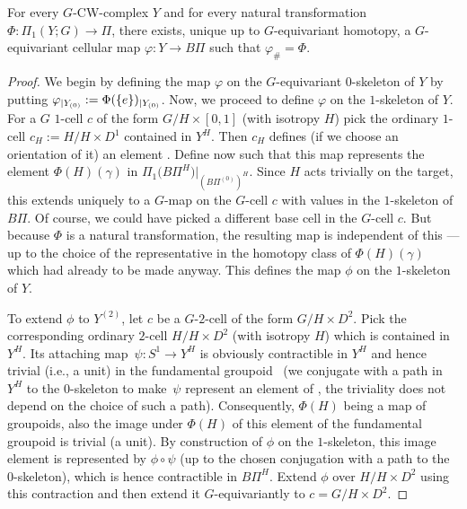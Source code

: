 \documentclass[10pt,a4paper]{amsart}
\begin{document}
	\begin{Proposition}\label{universalspace}
		For every $G$-CW-complex $Y$ and for every natural transformation $\Phi\colon
		\Pi_1(Y;\allowbreak G)\to \Pi$, there exists, unique up to $G$-equivariant
		homotopy, a $G$-equivariant cellular map
		$\varphi\colon Y\to B \Pi$
		such that
		$\varphi_{\#}=\Phi$.
	\end{Proposition}

	\begin{proof}
		We begin by defining the map $\varphi$ on the $G$-equivariant $0$-skeleton of $Y$ by putting
		$\varphi_{|Y_{(0)}}:=\smash{\Phi(\{e\})_{|Y_{(0)}}}$.
		Now, we proceed to define $\varphi$ on the $1$-skeleton of $Y$. For a $G$
		$1$-cell
		$c$ of the form $G/H\times [0,1]$ (with isotropy $H$) pick the ordinary
		$1$-cell $c_H:=H/H\times D^1$ contained in $Y^H$. Then $c_H$
		defines (if we choose an orientation of it) an element . Define now  such that
		this map represents the element $\Phi(H)(\gamma)$ in
		$\Pi_1\bigl(B\Pi^H\bigr)|_{ (B\Pi^{ (0)} )^H}$. Since $H$ acts trivially on the target, this extends
		uniquely to a $G$-map on the $G$-cell $c$ with values in the
		$1$-skeleton of $B\Pi$. Of course, we could have picked a different base cell
		in the $G$-cell $c$. But because $\Phi$ is a natural transformation, the
		resulting map is independent of this ---up to the choice of the representative in the
		homotopy class of $\Phi(H)(\gamma)$ which had already to be made anyway.
		This defines the map $\phi$ on the $1$-skeleton of $Y$.
		
		To extend $\phi$ to $Y^{(2)}$, let $c$ be a $G$-$2$-cell of the form
		$G/H\times D^2$. Pick the corresponding ordinary $2$-cell $H/H\times
		D^2$ (with isotropy $H$)
		which is contained in $Y^{H}$. Its attaching map~${\psi\colon S^1\to Y^{H}}$
		is obviously contractible in $Y^{H}$ and hence trivial (i.e., a unit) in
		the fundamental groupoid~ (we conjugate with a path in
		$Y^H$ to the $0$-skeleton to make~$\psi$
		represent an element of , the triviality does not
		depend on the choice of such a path). Consequently, $\Phi(H)$ being a map of
		groupoids, also the image under $\Phi(H)$ of this element of the fundamental
		groupoid is trivial (a unit). By construction of $\phi$ on the $1$-skeleton,
		this image element is represented by $\phi\circ\psi$ (up to the chosen
		conjugation with a path to the $0$-skeleton), which is hence contractible in
		$B\Pi^H$. Extend $\phi$ over $H/H\times D^2$ using this contraction and then
		extend it $G$-equivariantly to $c=G/H\times D^2$.
		

\end{proof}
\end{document}
